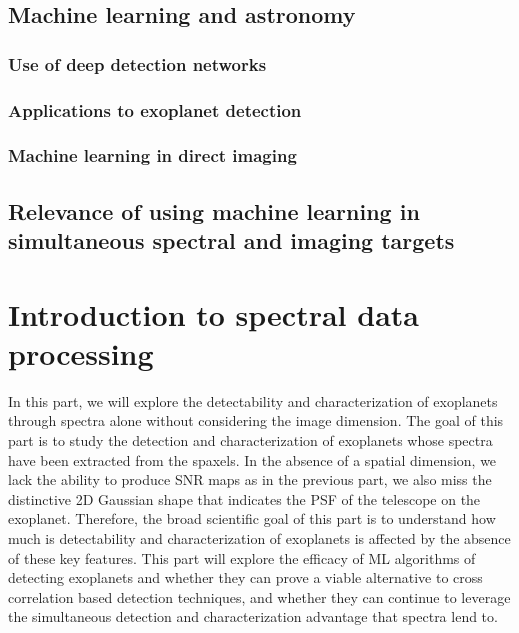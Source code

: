 \section{Machine learning and astronomy}
\subsection{Use of deep detection networks}
\subsection{Applications to exoplanet detection}
\subsection{Machine learning in direct imaging}
\section{Relevance of using machine learning in simultaneous spectral and imaging targets}
\chapter{Introduction to spectral data processing}\label{chap: I.1}

In this part, we will explore the detectability and characterization of exoplanets through spectra alone without considering the image dimension. 
The goal of this part is to study the detection and characterization of exoplanets whose spectra have been extracted from the spaxels.
In the absence of a spatial dimension, we lack the ability to produce SNR maps as in the previous part, we also miss the distinctive 2D Gaussian shape that indicates the PSF of the telescope on the exoplanet.
Therefore, the broad scientific goal of this part is to understand how much is detectability and characterization of exoplanets is affected by the absence of these key features.
This part will explore the efficacy of ML algorithms of detecting exoplanets and whether they can prove a viable alternative to cross correlation based detection techniques, and whether they can continue to leverage the simultaneous detection and characterization advantage that spectra lend to.

